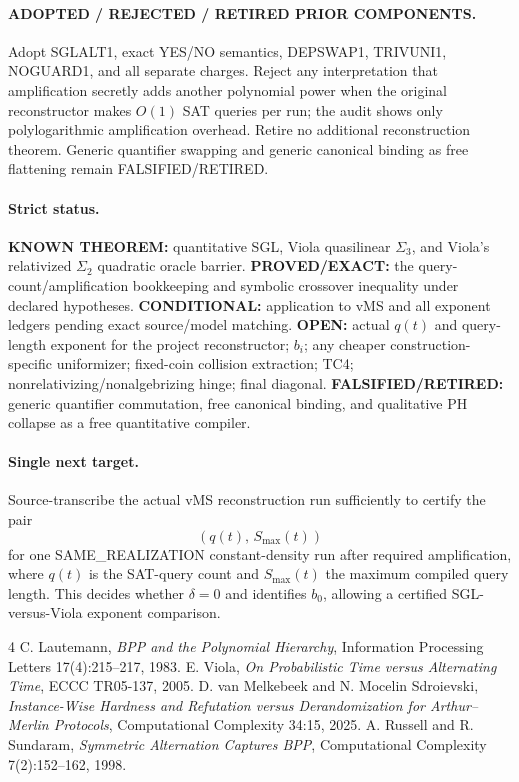\documentclass[11pt]{article}
\begin{document}
\paragraph{ADOPTED / REJECTED / RETIRED PRIOR COMPONENTS.}
Adopt SGLALT1, exact YES/NO semantics, DEPSWAP1, TRIVUNI1, NOGUARD1, and all separate charges.
Reject any interpretation that amplification secretly adds another polynomial power when the original reconstructor makes $O(1)$ SAT queries per run; the audit shows only polylogarithmic amplification overhead.
Retire no additional reconstruction theorem. Generic quantifier swapping and generic canonical binding as free flattening remain FALSIFIED/RETIRED.

\paragraph{Strict status.}
\textbf{KNOWN THEOREM:} quantitative SGL, Viola quasilinear $\Sigma_3$, and Viola's relativized $\Sigma_2$ quadratic oracle barrier.
\textbf{PROVED/EXACT:} the query-count/amplification bookkeeping and symbolic crossover inequality under declared hypotheses.
\textbf{CONDITIONAL:} application to vMS and all exponent ledgers pending exact source/model matching.
\textbf{OPEN:} actual $q(t)$ and query-length exponent for the project reconstructor; $b_i$; any cheaper construction-specific uniformizer; fixed-coin collision extraction; TC4; nonrelativizing/nonalgebrizing hinge; final diagonal.
\textbf{FALSIFIED/RETIRED:} generic quantifier commutation, free canonical binding, and qualitative PH collapse as a free quantitative compiler.

\paragraph{Single next target.}
Source-transcribe the actual vMS reconstruction run sufficiently to certify the pair
\[
\boxed{(q(t),\,S_{\max}(t))}
\]
for one SAME\_REALIZATION constant-density run after required amplification, where $q(t)$ is the SAT-query count and $S_{\max}(t)$ the maximum compiled query length. This decides whether $\delta=0$ and identifies $b_0$, allowing a certified SGL-versus-Viola exponent comparison.

\begin{thebibliography}{4}
 C. Lautemann, \emph{BPP and the Polynomial Hierarchy}, Information Processing Letters 17(4):215--217, 1983.
 E. Viola, \emph{On Probabilistic Time versus Alternating Time}, ECCC TR05-137, 2005.
 D. van Melkebeek and N. Mocelin Sdroievski, \emph{Instance-Wise Hardness and Refutation versus Derandomization for Arthur--Merlin Protocols}, Computational Complexity 34:15, 2025.
 A. Russell and R. Sundaram, \emph{Symmetric Alternation Captures BPP}, Computational Complexity 7(2):152--162, 1998.
\end{thebibliography}
\end{document}
